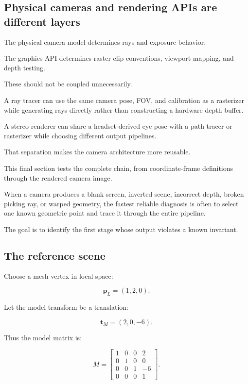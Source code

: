 \subsection{Physical cameras and rendering APIs are different layers}\label{02-foundations-ii-ch037-physical-cameras-and-rendering-apis-are-different-layers}

The physical camera model determines rays and exposure behavior.

The graphics API determines raster clip conventions, viewport mapping, and depth testing.

These should not be coupled unnecessarily.

A ray tracer can use the same camera pose, FOV, and calibration as a rasterizer while generating rays directly rather than constructing a hardware depth buffer.

A stereo renderer can share a headset-derived eye pose with a path tracer or rasterizer while choosing different output pipelines.

That separation makes the camera architecture more reusable.

This final section tests the complete chain, from coordinate-frame definitions through the rendered camera image.

When a camera produces a blank screen, inverted scene, incorrect depth, broken picking ray, or warped geometry, the fastest reliable diagnosis is often to select one known geometric point and trace it through the entire pipeline.

The goal is to identify the first stage whose output violates a known invariant.

\subsection{The reference scene}\label{02-foundations-ii-ch037-the-reference-scene}

Choose a mesh vertex in local space:

\[ \boxed{ \mathbf p_L=(1,2,0). } \]

Let the model transform be a translation:

\[ \boxed{ \mathbf t_M=(2,0,-6). } \]

Thus the model matrix is:

\[ M= \begin{bmatrix} 1&0&0&2\\ 0&1&0&0\\ 0&0&1&-6\\ 0&0&0&1 \end{bmatrix}. \]

